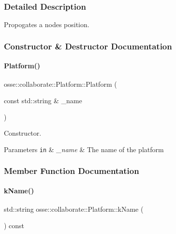 \subsubsection{Detailed Description}
Propogates a node\textquotesingle{}s position. 

\subsubsection{Constructor \& Destructor Documentation}
\mbox{\label{classosse_1_1collaborate_1_1_platform_aca95bfbb4f84285f1767d575a3e4c2ec}} 
\paragraph{\texorpdfstring{Platform()}{Platform()}}
{\footnotesize\ttfamily osse\+::collaborate\+::\+Platform\+::\+Platform (\begin{DoxyParamCaption}\item[{const std\+::string \&}]{\+\_\+name }\end{DoxyParamCaption})\hspace{0.3cm}{\ttfamily [explicit]}}



Constructor. 


\begin{DoxyParams}[1]{Parameters}
\mbox{\tt in}  & {\em \+\_\+name} & The name of the platform \\
\hline
\end{DoxyParams}


\subsubsection{Member Function Documentation}
\mbox{\label{classosse_1_1collaborate_1_1_platform_a87b0b2589a6246dfd90ba3168ebf285c}} 
\paragraph{\texorpdfstring{k\+Name()}{kName()}}
{\footnotesize\ttfamily std\+::string osse\+::collaborate\+::\+Platform\+::k\+Name (\begin{DoxyParamCaption}{ }\end{DoxyParamCaption}) const\hspace{0.3cm}{\ttfamily [inline]}}



